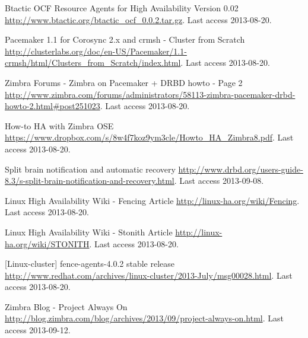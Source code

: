 \begin{thebibliography}{1}
 Btactic OCF Resource Agents for High Availability Version 0.02
\url{http://www.btactic.org/btactic_ocf_0.0.2.tar.gz}. Last access 2013-08-20.


 Pacemaker 1.1 for Corosync 2.x and crmsh - Cluster from Scratch
\url{http://clusterlabs.org/doc/en-US/Pacemaker/1.1-crmsh/html/Clusters_from_Scratch/index.html}. Last access 2013-08-20.


 Zimbra Forums - Zimbra on Pacemaker + DRBD howto - Page 2
\url{http://www.zimbra.com/forums/administrators/58113-zimbra-pacemaker-drbd-howto-2.html#post251023}. Last access 2013-08-20.

 How-to HA with Zimbra OSE
\url{https://www.dropbox.com/s/8w4f7koz9ym3cle/Howto_HA_Zimbra8.pdf}. Last access 2013-08-20.

 Split brain notification and automatic recovery
\url{http://www.drbd.org/users-guide-8.3/s-split-brain-notification-and-recovery.html}. Last access 2013-09-08.


 Linux High Availability Wiki - Fencing Article
\url{http://linux-ha.org/wiki/Fencing}. Last access 2013-08-20.

 Linux High Availability Wiki - Stonith Article
\url{http://linux-ha.org/wiki/STONITH}. Last access 2013-08-20.

 [Linux-cluster] fence-agents-4.0.2 stable release
\url{http://www.redhat.com/archives/linux-cluster/2013-July/msg00028.html}. Last access 2013-08-20.

 Zimbra Blog - Project Always On
\url{http://blog.zimbra.com/blog/archives/2013/09/project-always-on.html}. Last access 2013-09-12.


\end{thebibliography}


